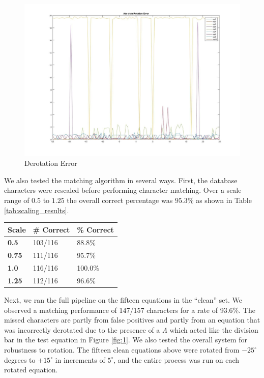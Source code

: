\documentclass[journal]{IEEEtran}
\begin{document}
\begin{figure}[!t]
    \centering
    \includegraphics[width=\columnwidth]{deskew_results_graph}
    \caption{Derotation Error}
    \label{fig:deskew_graph}
\end{figure}

We also tested the matching algorithm in several ways. First, the database characters were rescaled before performing character matching. Over a scale range of $0.5$ to $1.25$ the overall correct percentage was $95.3\%$ as shown in Table \ref{tab:scaling_results}.

\begin{minipage}{\columnwidth}
     \label{tab:scaling_results} 
    \begin{tabularx}{\columnwidth}{|X|X|X|}
        \hline
        \textbf{Scale} & \textbf{\# Correct} & \textbf{\% Correct}\\
        \hline
        \hline
        \textbf{0.5} &	103/116 &	88.8\%\\
        \hline
        \textbf{0.75} &	111/116 &	95.7\%\\
        \hline
        \textbf{1.0}	 & 116/116 &	100.0\%\\
        \hline
        \textbf{1.25} &	112/116 &	96.6\%\\
        \hline
    \end{tabularx}    
\end{minipage}

Next, we ran the full pipeline on the fifteen equations in the “clean” set. We observed a matching performance of 147/157 characters for a rate of 93.6\%. The missed characters are partly from false positives and partly from an equation that was incorrectly derotated due to the presence of a $\Lambda$ which acted like the division bar in the test equation in Figure \ref{fig:1}.
We also tested the overall system for robustness to rotation. The fifteen clean equations above were rotated from $-25^\circ$ degrees to $+15^\circ$ in increments of $5^\circ$, and the entire process was run on each rotated equation.
\end{document}
